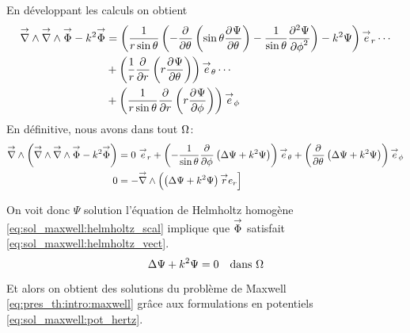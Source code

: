 % 
En développant les calculs on obtient
\begin{align*}
  \vrot \vrot \vect \Phi - k^2 \vect \Phi 
  &= \left(\frac{1}{r\sin\theta}\left(-\ddr{\theta}{}\left(\sin\theta\ddr{\theta}{\Psi}\right)-\frac{1}{\sin\theta}\ddr[2]{\phi}{\Psi}\right)-k^2\Psi\right)\vect e_r \cdots \\
  &+ \left(\frac{1}{r}\ddr{r}{}\left(r\ddr{\theta}{\Psi}\right)\right)\vect e_\theta \cdots \\
  &+ \left(\frac{1}{r\sin\theta}\ddr{r}{}\left(r\ddr{\phi}{\Psi}\right)\right)\vect e_\phi
\end{align*}
En définitive, nous avons dans tout \(\OO\):
\begin{align*}
  \vrot\left(\vrot \vrot \vect \Phi - k^2 \vect \Phi\right) 
  &= %
   0 ~ \vect e_r 
  + \left(-\frac{1}{\sin\theta}\ddr{\phi}{}\left(\Delta \Psi + k^2 \Psi \right)\right)\vect e_\theta 
  + \left(\ddr{\theta}{}\left(\Delta \Psi + k^2 \Psi \right)\right)\vect e_\phi \\
  0 &= -\vrot \left( \left(\Delta \Psi + k^2\Psi\right)\vect r e_r\right]
\end{align*}

On voit donc \(\Psi\) solution l'équation de Helmholtz homogène  \eqref{eq:sol_maxwell:helmholtz_scal} implique que \(\vect \Phi\) satisfait \eqref{eq:sol_maxwell:helmholtz_vect}.
\begin{equation}
  \label{eq:sol_maxwell:helmholtz_scal}
   \Delta \Psi + k^2\Psi = 0 \quad \text{dans \(\OO\)}
\end{equation}

Et alors on obtient des solutions du problème de Maxwell \eqref{eq:pres_th:intro:maxwell} grâce aux formulations en potentiels \eqref{eq:sol_maxwell:pot_hertz}.
